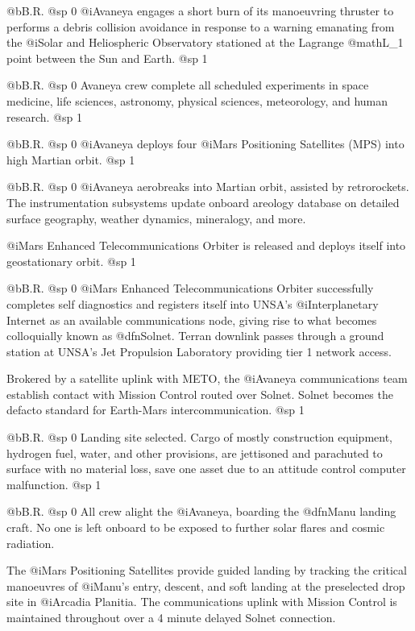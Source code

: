 @b{B.R.}
@sp 0
@i{Avaneya} engages a short burn of its manoeuvring thruster to performs a debris collision avoidance in response to a warning emanating from the @i{Solar and Heliospheric Observatory} stationed at the Lagrange @math{L_1} point between the Sun and Earth.
@sp 1

@b{B.R.}
@sp 0
Avaneya crew complete all scheduled experiments in space medicine, life sciences, astronomy, physical sciences, meteorology, and human research.
@sp 1

@b{B.R.}
@sp 0
@i{Avaneya} deploys four @i{Mars Positioning Satellites} (MPS) into high Martian orbit.
@sp 1

@b{B.R.}
@sp 0
@i{Avaneya} aerobreaks into Martian orbit, assisted by retrorockets. The instrumentation subsystems update onboard areology database on detailed surface geography, weather dynamics, mineralogy, and more.

@i{Mars Enhanced Telecommunications Orbiter} is released and deploys itself into geostationary orbit.
@sp 1

@b{B.R.}
@sp 0
@i{Mars Enhanced Telecommunications Orbiter} successfully completes self diagnostics and registers itself into UNSA's @i{Interplanetary Internet} as an available communications node, giving rise to what becomes colloquially known as @dfn{Solnet}. Terran downlink passes through a ground station at UNSA's Jet Propulsion Laboratory providing tier 1 network access.

Brokered by a satellite uplink with METO, the @i{Avaneya} communications team establish contact with Mission Control routed over Solnet. Solnet becomes the defacto standard for Earth-Mars intercommunication.
@sp 1

@b{B.R.}
@sp 0
Landing site selected. Cargo of mostly construction equipment, hydrogen fuel, water, and other provisions, are jettisoned and parachuted to surface with no material loss, save one asset due to an attitude control computer malfunction.
@sp 1

@b{B.R.}
@sp 0
All crew alight the @i{Avaneya}, boarding the @dfn{Manu} landing craft. No one is left onboard to be exposed to further solar flares and cosmic radiation.

The @i{Mars Positioning Satellites} provide guided landing by tracking the critical manoeuvres of @i{Manu's} entry, descent, and soft landing at the preselected drop site in @i{Arcadia Planitia}. The communications uplink with Mission Control is maintained throughout over a 4 minute delayed Solnet connection.

